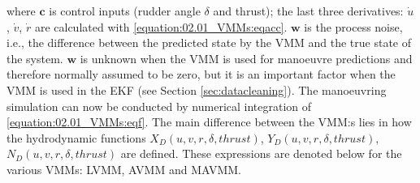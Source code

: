 \sphinxAtStartPar
where \(\mathbf{c}\) is control inputs (rudder angle \(\delta\) and thrust); the last three derivatives: \(\dot{u}\), \(\dot{v}\), \(\dot{r}\) are calculated with \autoref{equation:02.01_VMMs:eqacc}.
\(\mathbf{w}\) is the process noise, i.e., the difference between the predicted state by the VMM and the true
state of the system. \(\mathbf{w}\) is unknown when the VMM is used for manoeuvre predictions and therefore normally
assumed to be zero, but it is an important factor when the VMM is used in the EKF (see Section \ref{sec:datacleaning}).
The manoeuvring simulation can now be conducted by numerical integration of \autoref{equation:02.01_VMMs:eqf}. The main difference between the VMM:s lies in how the hydrodynamic functions \(X_D(u,v,r,\delta,thrust)\), \(Y_D(u,v,r,\delta,thrust)\), \(N_D(u,v,r,\delta,thrust)\) are defined. These expressions are denoted below for the various VMMs: LVMM, AVMM and MAVMM.

